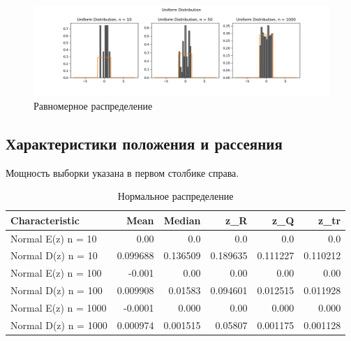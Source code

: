\documentclass[../body.tex]{subfiles}
\begin{document}
	\begin{figure}[H]
		\centering
		\includegraphics[width=\textwidth, height =0.25\textheight]{img/Uniform.png}
		\caption{Равномерное распределение}
		\label{fig:uniform}
	\end{figure}

	\subsection{Характеристики положения и рассеяния}
	Мощность выборки указана в первом столбике справа.
	\begin{table}[H]
		\centering
		\begin{tabular}[t]{lrrrrr}
			\hline
			Characteristic   &      Mean &    Median &       z\_R &      z\_Q &      z\_tr \\
			\hline
			Normal E(z) n = 10   &  0.00 &  0.0 &  0.0 & 0.0  &  0.0 \\
			Normal D(z) n = 10   &  0.099688 &  0.136509 &  0.189635 & 0.111227 &  0.110212 \\
			Normal E(z) n = 100  & -0.001 &  0.00  &  0.00 & 0.00 &  0.00 \\
			Normal D(z) n = 100  &  0.009908 &  0.01583  &  0.094601 & 0.012515 &  0.011928 \\
			Normal E(z) n = 1000 & -0.0001 & 0.000  & 0.00  & 0.000  & 0.000 \\
			Normal D(z) n = 1000 &  0.000974 &  0.001515 &  0.05807  & 0.001175 &  0.001128 \\
			\hline
		\end{tabular}
		\caption{Нормальное распределение}
		\label{tab:normal}
	\end{table}
\end{document}
